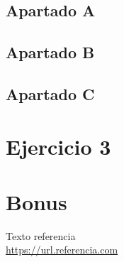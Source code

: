 \documentclass[11pt,a4paper]{article}
\begin{document}
\subsection{Apartado A}

\subsection{Apartado B}

\subsection{Apartado C}

\newpage

\section{Ejercicio 3}

\newpage

\section{Bonus}

\newpage

\begin{thebibliography}{5}

Texto referencia
\\\url{https://url.referencia.com}

\end{thebibliography}
\end{document}
